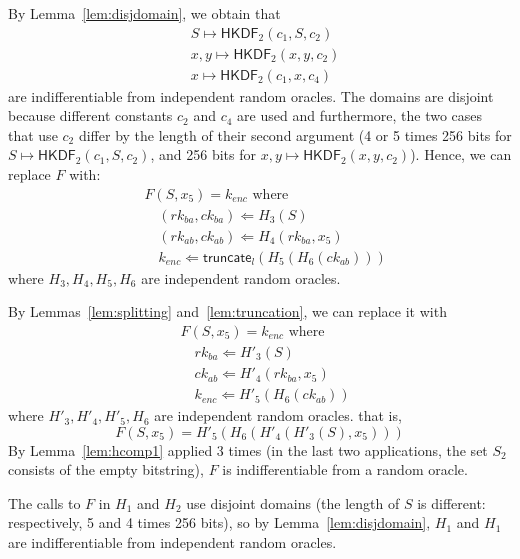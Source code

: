 \documentclass[compsoc, conference, letterpaper, 10pt, times]{IEEEtran}
\newcommand{\HKDF}{\mathsf{HKDF}}
\newcommand{\e}{\mathit{enc}}
\newcommand{\rk}{\mathit{rk}}
\newcommand{\ck}{\mathit{ck}}
\newcommand{\hkdftwo}{\HKDF_2}
\newcommand{\truncate}{\mathsf{truncate}}
\begin{document}
By Lemma~\ref{lem:disjdomain}, we obtain that
\begin{align*}
&S \mapsto \hkdftwo(c_1, S, c_2)\\
&x,y \mapsto \hkdftwo(x,y,c_2)\\
&x \mapsto \hkdftwo(c_1,x,c_4)
\end{align*}
are indifferentiable from independent random oracles.
The domains are disjoint 
because different constants $c_2$ and $c_4$ are used and furthermore, the two cases that use $c_2$ differ by the length of their second argument (4 or 5 times 256 bits for
$S \mapsto \hkdftwo(c_1, S, c_2)$, and 256 bits for $x,y \mapsto \hkdftwo(x,y,c_2)$).
Hence, we can replace $F$ with:
\begin{align*}
&F(S, x_5) = k_{\e}\text{ where}\\
&\quad  (\rk_{ba}, \ck_{ba}) \Leftarrow H_3(S)\\
&\quad  (\rk_{ab}, \ck_{ab}) \Leftarrow H_4(\rk_{ba}, x_5)\\
&\quad  k_{\e} \Leftarrow \truncate_l(H_5(H_6(\ck_{ab})))
\end{align*}
where $H_3, H_4, H_5, H_6$ are independent random oracles.

By Lemmas~\ref{lem:splitting} and~\ref{lem:truncation},
we can replace it with
\begin{align*}
&F(S, x_5) = k_{\e}\text{ where}\\
&\quad  \rk_{ba} \Leftarrow H'_3(S)\\
&\quad  \ck_{ab} \Leftarrow H'_4(\rk_{ba}, x_5)\\
&\quad  k_{\e} \Leftarrow H'_5(H_6(\ck_{ab}))
\end{align*}
where $H'_3, H'_4, H'_5, H_6$ are independent random oracles.
that is,
\[F(S, x_5) = H'_5(H_6(H'_4(H'_3(S),x_5)))\]
By Lemma~\ref{lem:hcomp1} applied 3 times (in the last two applications,
the set $S_2$ consists of the empty bitstring), $F$ is indifferentiable
from a random oracle.

The calls to $F$ in $H_1$ and $H_2$ use disjoint domains 
(the length of $S$ is different: respectively, 5 and 4 times 256 bits),
so by Lemma~\ref{lem:disjdomain}, $H_1$ and $H_1$ are indifferentiable
from independent random oracles.



\end{document}
